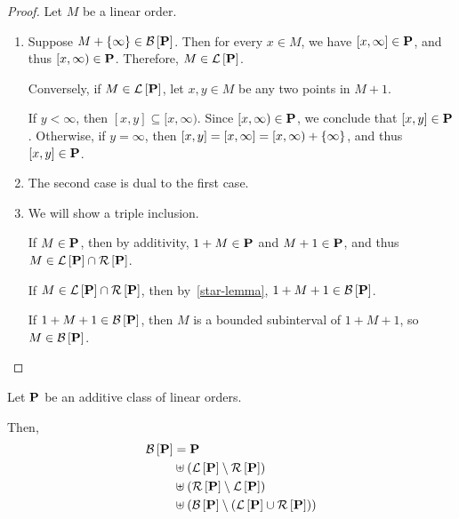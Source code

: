 \begin{proof}
  Let $M$ be a linear order.

  \begin{enumerate}
    \item
          Suppose $M + \left\{ {\infty} \right\} \in \mathcal{B} \left[ {{\mathbf{P}}} \right]$.
          Then for every $x \in M$, we have $[x, \infty] \in \mathbf{P}$,
          and thus $[x, \infty) \in \mathbf{P}$.
          Therefore, $M \in \mathcal{L} \left[ {{\mathbf{P}}} \right]$.

          Conversely, if $M \in \mathcal{L} \left[ {{\mathbf{P}}} \right]$,
          let $x, y \in M$ be any two points in $M + 1$.

          If $y < \infty$, then $[x, y] \subseteq [x, \infty)$.
          Since $[x, \infty) \in \mathbf{P}$, we conclude that $[x, y] \in \mathbf{P}$.
          Otherwise, if $y = \infty$, then $[x, y] = [x, \infty] = [x, \infty) + \left\{ {\infty} \right\}$, and thus $[x, y] \in \mathbf{P}$.

    \item
          The second case is dual to the first case.

    \item
          We will show a triple inclusion.

          If $M \in \mathbf{P}$, then by additivity,
          $1 + M \in \mathbf{P}$ and $M + 1 \in \mathbf{P}$,
          and thus $M \in \mathcal{L} \left[ {{\mathbf{P}}} \right] \cap \mathcal{R} \left[ {{\mathbf{P}}} \right]$.

          If $M \in \mathcal{L} \left[ {{\mathbf{P}}} \right] \cap \mathcal{R} \left[ {{\mathbf{P}}} \right]$, then by~\cref{star-lemma},
          $1 + M + 1 \in \mathcal{B} \left[ {{\mathbf{P}}} \right]$.

          If $1 + M + 1 \in \mathcal{B} \left[ {{\mathbf{P}}} \right]$, then $M$ is a bounded
          subinterval of $1 + M + 1$, so $M \in \mathcal{B} \left[ {{\mathbf{P}}} \right]$.
  \end{enumerate}
\end{proof}

\begin{lemma}
  Let $\mathbf{P}$ be an additive class of linear orders.

  Then,
  \begin{align*}
    \mathcal{B} \left[ {{\mathbf{P}}} \right] & = \mathbf{P}                                                            \\
                  & \uplus \left( {\mathcal{L} \left[ {{\mathbf{P}}} \right] \setminus \mathcal{R} \left[ {{\mathbf{P}}} \right]} \right)                          \\
                  & \uplus \left( {\mathcal{R} \left[ {{\mathbf{P}}} \right] \setminus \mathcal{L} \left[ {{\mathbf{P}}} \right]} \right)                          \\
                  & \uplus \left( { \mathcal{B} \left[ {{\mathbf{P}}} \right] \setminus \left( {\mathcal{L} \left[ {{\mathbf{P}}} \right] \cup \mathcal{R} \left[ {{\mathbf{P}}} \right]} \right)} \right)
  \end{align*}
\end{lemma}

